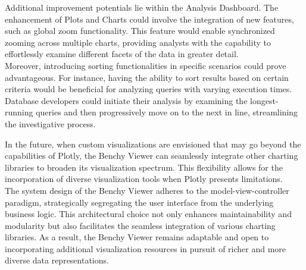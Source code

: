 Additional improvement potentials lie within the Analysis Dashboard. The enhancement of Plots and Charts could involve the integration of new features, such as global zoom functionality. This feature would enable synchronized zooming across multiple charts, providing analysts with the capability to effortlessly examine different facets of the data in greater detail.\\
Moreover, introducing sorting functionalities in specific scenarios could prove advantageous. For instance, having the ability to sort results based on certain criteria would be beneficial for analyzing queries with varying execution times. Database developers could initiate their analysis by examining the longest-running queries and then progressively move on to the next in line, streamlining the investigative process.

In the future, when custom visualizations are envisioned that may go beyond the capabilities of Plotly, the Benchy Viewer can seamlessly integrate other charting libraries to broaden its visualization spectrum. This flexibility allows for the incorporation of diverse visualization tools when Plotly presents limitations.\\
The system design of the Benchy Viewer adheres to the model-view-controller paradigm, strategically segregating the user interface from the underlying business logic. This architectural choice not only enhances maintainability and modularity but also facilitates the seamless integration of various charting libraries. As a result, the Benchy Viewer remains adaptable and open to incorporating additional visualization resources in pursuit of richer and more diverse data representations.







